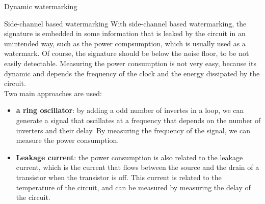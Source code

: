 \begin{section}{Dynamic watermarking}
  \begin{subsection}{Side-channel based watermarking}
    With side-channel based watermarking, the signature is embedded in some information that is leaked
    by the circuit in an unintended way, such as the power compsumption, which is usually used as 
    a watermark. Of course, the signature should be below the noise floor, to be not easily detectable.
    Measuring the power consumption  is not very easy, because its dynamic and depends the frequency 
    of the clock and the energy dissipated by the circuit.\\
    Two main approaches are used:
    \begin{itemize}
      \item \textbf{a ring oscillator}: by adding a odd number of invertes in a loop, we can generate
        a signal that oscillates at a frequency that depends on the number of inverters and their delay.
        By measuring the frequency of the signal, we can measure the power consumption.

      \item \textbf{Leakage current}: the power consumption is also related to the leakage current, 
        which is the current that flows between the source and the drain of a transistor when the 
        transistor is off. This current is related to the temperature of the circuit, and can be 
        measured by measuring the delay of the circuit.
    \end{itemize}

  \end{subsection}
\end{section}
